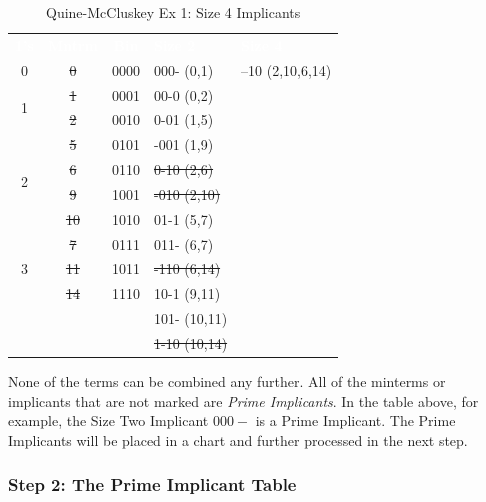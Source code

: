 \begin{table}[H]
	\sffamily
	\newcommand{\head}[1]{\textcolor{white}{\textbf{#1}}}		
	\begin{center}
		\begin{tabular}{ccc|l|l} 
			\rowcolor{black!75}
			\head{1's} & \head{Mntrm} 
			& \head{Bin} & \head{Size 2} & \head{Size 4} \\
			                 0 & \sout{0}  & 0000 & 000- (0,1)  & --10 (2,10,6,14) \\
			\cline{1-3}
			\multirow{2}{*}{1} & \sout{1}  & 0001 & 00-0 (0,2)  & \\
			                   & \sout{2}  & 0010 & 0-01 (1,5)  & \\
			\cline{1-3}
			\multirow{4}{*}{2} & \sout{5}  & 0101 & -001 (1,9)  & \\
                               & \sout{6}  & 0110 & \sout{0-10 (2,6)}  & \\		
			                   & \sout{9}  & 1001 & \sout{-010 (2,10)} & \\		
			                   & \sout{10} & 1010 & 01-1 (5,7)  & \\
			\cline{1-3}
			\multirow{3}{*}{3} & \sout{7}  & 0111 & 011- (6,7)  & \\
			                   & \sout{11} & 1011 & \sout{-110 (6,14)} & \\		
			                   & \sout{14} & 1110 & 10-1 (9,11) & \\
			\cline{1-3}
			                   &           &      & 101- (10,11) & \\
			                   &           &      & \sout{1-10 (10,14)} & \\
			\hline
		\end{tabular}
	\end{center}
	\caption{Quine-McCluskey Ex 1: Size 4 Implicants}
  \label{ASM:tab:quine-mccluskey_ex_1_size_4_implicants}
\end{table}

None of the terms can be combined any further. All of the minterms or implicants that are not marked are \emph{Prime Implicants}. In the table above, for example, the Size Two Implicant $ 000- $ is a Prime Implicant. The Prime Implicants will be placed in a chart and further processed in the next step. 

\subsubsection{Step 2: The Prime Implicant Table}
\label{ASM:subsubsec:quine-mccluskey_ex_1_step_2}

